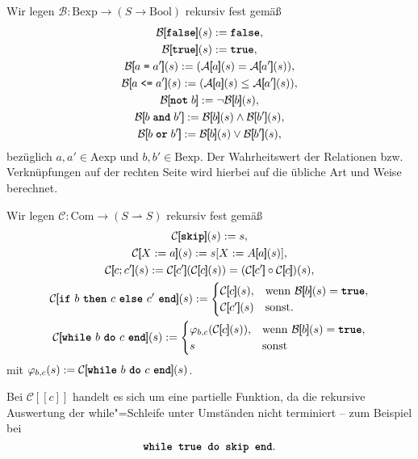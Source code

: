 \documentclass[8pt,fleqn,aspectratio=169]{beamer}
\newcommand{\parspace}{\vspace{0.8em}}
\newcommand{\kw}[1]{\textbf{\texttt{#1}}}
\newcommand{\code}[1]{{\texttt{#1}}}
\newcommand{\qb}[1]{[\!\![#1]\!\!]}
\newcommand{\Bool}{\mathrm{Bool}}
\newcommand{\Aexp}{\mathrm{Aexp}}
\newcommand{\Bexp}{\mathrm{Bexp}}
\newcommand{\Com}{\mathrm{Com}}
\newcommand{\evA}{\mathcal A}
\newcommand{\evB}{\mathcal B}
\newcommand{\evC}{\mathcal C}
\begin{document}
\begin{frame}
Wir legen $\evB\colon\Bexp\to (S\to\Bool)$ rekursiv fest gemäß
\begin{gather*}
\evB\qb{\kw{false}}(s) := \kw{false},\\
\evB\qb{\kw{true}}(s) := \kw{true},\\
\evB\qb{a \;\code{=}\; a'}(s) := (\evA\qb{a}(s) = \evA\qb{a'}(s)),\\
\evB\qb{a \;\code{<=}\; a'}(s) := (\evA\qb{a}(s)\le \evA\qb{a'}(s)),\\
\evB\qb{\kw{not}\;b} := \lnot\evB\qb{b}(s),\\
\evB\qb{b\;\kw{and}\;b'} := \evB\qb{b}(s)\land\evB\qb{b'}(s),\\
\evB\qb{b\;\kw{or}\;b'} := \evB\qb{b}(s)\lor\evB\qb{b'}(s),
\end{gather*}
bezüglich $a,a'\in\Aexp$ und $b,b'\in\Bexp$. Der Wahrheitswert der
Relationen bzw. Verknüpfungen auf der rechten Seite wird hierbei auf die
übliche Art und Weise berechnet.
\end{frame}

\begin{frame}
Wir legen $\evC\colon\Com\to (S\rightharpoonup S)$ rekursiv fest gemäß
\begin{gather*}
\evC\qb{\kw{skip}}(s) := s,\\
\evC\qb{X:=a}(s) := s[X:=A\qb{a}(s)],\\
\evC\qb{c; c'}(s) := \evC\qb{c'}(\evC\qb{c}(s)) = (\evC\qb{c'}\circ \evC\qb{c})(s),\\
\evC\qb{\text{\kw{if} $b$ \kw{then} $c$ \kw{else} $c'$ \kw{end}}}(s) := \begin{cases}
\evC\qb{c}(s),& \text{wenn $\evB\qb{b}(s)=\kw{true}$},\\
\evC\qb{c'}(s)& \text{sonst}.
\end{cases}\\
\evC\qb{\text{\kw{while} $b$ \kw{do} $c$ \kw{end}}}(s) := \begin{cases}
\varphi_{b,c}(\evC\qb{c}(s)),& \text{wenn $\evB\qb{b}(s)=\kw{true}$},\\
s & \text{sonst}
\end{cases}
\end{gather*}
mit $\varphi_{b,c}(s) := \evC\qb{\text{\kw{while} $b$ \kw{do} $c$ \kw{end}}}(s)$.\pause

\parspace
Bei $\evC\qb{c}$ handelt es sich um eine partielle Funktion, da die rekursive Auswertung
der while"=Schleife unter Umständen nicht terminiert -- zum Beispiel bei
\[\texttt{\kw{while} \kw{true} \kw{do} \kw{skip} \kw{end}}.\]
\end{frame}
\end{document}
